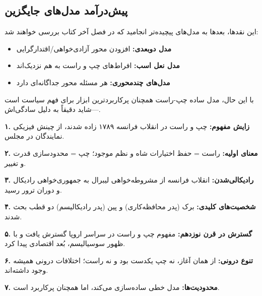 \subsection{پیش‌درآمد مدل‌های جایگزین}

این نقدها، بعدها به مدل‌های پیچیده‌تر انجامید که در فصل آخر کتاب بررسی خواهند شد:

\begin{itemize}[nosep, rightmargin=1.5cm]
    \item \textbf{مدل دوبعدی:} افزودن محور آزادی‌خواهی/اقتدارگرایی
    \item \textbf{مدل نعل اسب:} افراط‌های چپ و راست به هم نزدیک‌اند
    \item \textbf{مدل‌های چندمحوری:} هر مسئله محور جداگانه‌ای دارد
\end{itemize}

با این حال، مدل ساده چپ-راست همچنان پرکاربردترین ابزار برای فهم سیاست است—شاید دقیقاً به دلیل سادگی‌اش.


\newpage

\begin{summarybox}

\textbf{۱. زایش مفهوم:} چپ و راست در انقلاب فرانسه ۱۷۸۹ زاده شدند، از چینش فیزیکی نمایندگان در مجلس.

\textbf{۲. معنای اولیه:} راست = حفظ اختیارات شاه و نظم موجود؛ چپ = محدودسازی قدرت و تغییر.

\textbf{۳. رادیکالی‌شدن:} انقلاب فرانسه از مشروطه‌خواهی لیبرال به جمهوری‌خواهی رادیکال و دوران ترور رسید.

\textbf{۴. شخصیت‌های کلیدی:} برک (پدر محافظه‌کاری) و پین (پدر رادیکالیسم) دو قطب بحث شدند.

\textbf{۵. گسترش در قرن نوزدهم:} مفهوم چپ و راست در سراسر اروپا گسترش یافت و با ظهور سوسیالیسم، بُعد اقتصادی پیدا کرد.

\textbf{۶. تنوع درونی:} از همان آغاز، نه چپ یکدست بود و نه راست؛ اختلافات درونی همیشه وجود داشته‌اند.

\textbf{۷. محدودیت‌ها:} مدل خطی ساده‌سازی می‌کند، اما همچنان پرکاربرد است.

\end{summarybox}

\vspace{20pt}

